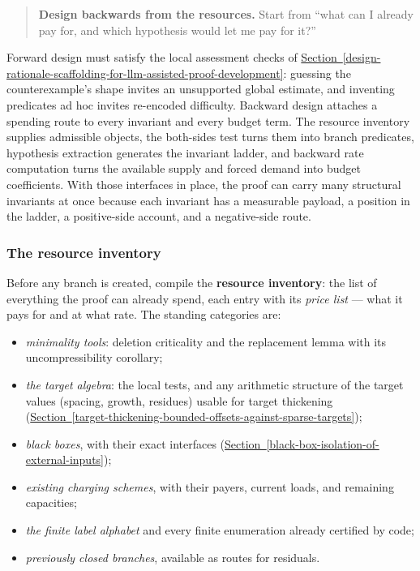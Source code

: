 \documentclass[
  11pt,
]{article}
\providecommand{\tightlist}{%
  \setlength{\itemsep}{0pt}\setlength{\parskip}{0pt}}
\theoremstyle{definition}
\newcommand{\secref}[1]{\hyperref[#1]{Section~\ref*{#1}}}
\begin{document}
\begin{quote}
\textbf{Design backwards from the resources.} Start from ``what can I
already pay for, and which hypothesis would let me pay for it?''
\end{quote}

Forward design must satisfy the local assessment checks of \secref{design-rationale-scaffolding-for-llm-assisted-proof-development}: guessing the
counterexample's shape invites an unsupported global estimate, and
inventing predicates ad hoc invites re-encoded difficulty. Backward
design attaches a spending route to every invariant and every budget
term. The resource inventory supplies admissible objects, the both-sides
test turns them into branch predicates, hypothesis extraction generates
the invariant ladder, and backward rate computation turns the available
supply and forced demand into budget coefficients. With those interfaces
in place, the proof can carry many structural invariants at once because
each invariant has a measurable payload, a position in the ladder, a
positive-side account, and a negative-side route.

\subsubsection{The resource
inventory}\label{the-resource-inventory}

Before any branch is created, compile the \textbf{resource inventory}:
the list of everything the proof can already spend, each entry with its
\emph{price list} --- what it pays for and at what rate. The standing
categories are:

\begin{itemize}
\tightlist
\item
  \emph{minimality tools}: deletion criticality and the replacement
  lemma with its uncompressibility corollary;
\item
  \emph{the target algebra}: the local tests, and any arithmetic
  structure of the target values (spacing, growth, residues) usable for
  target thickening (\secref{target-thickening-bounded-offsets-against-sparse-targets});
\item
  \emph{black boxes}, with their exact interfaces (\secref{black-box-isolation-of-external-inputs});
\item
  \emph{existing charging schemes}, with their payers, current loads,
  and remaining capacities;
\item
  \emph{the finite label alphabet} and every finite enumeration already
  certified by code;
\item
  \emph{previously closed branches}, available as routes for residuals.
\end{itemize}
\end{document}
